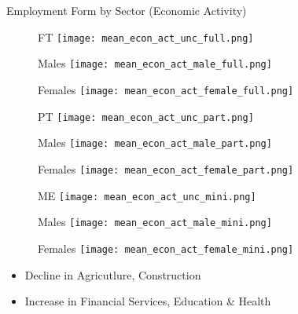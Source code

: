 \documentclass[hyperref={bookmarks=false}]{beamer}
\begin{document}
\begin{appendix}
\begin{frame}{Employment Form by Sector (Economic Activity)}
\begin{figure}[!t]
\centering
\begin{minipage}[b]{0.32\textwidth}{FT}
\centering
\texttt{[image: mean\_econ\_act\_unc\_full.png]}
\end{minipage}
\begin{minipage}[b]{0.32\textwidth}{Males}
\centering
\texttt{[image: mean\_econ\_act\_male\_full.png]}
\end{minipage}
\begin{minipage}[b]{0.32\textwidth}{Females}
\centering
\texttt{[image: mean\_econ\_act\_female\_full.png]}
\end{minipage}
\begin{minipage}[b]{0.32\textwidth}{PT}
\centering
\texttt{[image: mean\_econ\_act\_unc\_part.png]}
\end{minipage}
\begin{minipage}[b]{0.32\textwidth}{Males}
\centering
\texttt{[image: mean\_econ\_act\_male\_part.png]}
\end{minipage}
\begin{minipage}[b]{0.32\textwidth}{Females}
\centering
\texttt{[image: mean\_econ\_act\_female\_part.png]}
\end{minipage}
\begin{minipage}[b]{0.32\textwidth}{ME}
\centering
\texttt{[image: mean\_econ\_act\_unc\_mini.png]}
\end{minipage}
\begin{minipage}[b]{0.32\textwidth}{Males}
\centering
\texttt{[image: mean\_econ\_act\_male\_mini.png]}
\end{minipage}
\begin{minipage}[b]{0.32\textwidth}{Females}
\centering
\texttt{[image: mean\_econ\_act\_female\_mini.png]}
\end{minipage}
\end{figure}
\begin{itemize}
\setlength{\itemsep}{0.7 cm}
\item Decline in Agricutlure, Construction
\item Increase in Financial Services, Education \& Health
\end{itemize}
\hyperlink{DATA3}{}
\end{frame}


\end{appendix}
\end{document}
